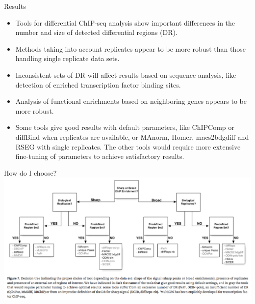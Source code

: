 \documentclass{beamer}
\begin{document}
\begin{frame}{Results}
\begin{itemize}
\item Tools for differential ChIP-seq analysis show important differences in the number and size of detected differential regions (DR).
\item Methods taking into account replicates appear to be more robust than those handling single replicate data sets.
\item Inconsistent sets of DR will affect results based on sequence analysis, like detection of enriched transcription factor binding sites.
\item Analysis of functional enrichments based on neighboring genes appears to be more robust.
\item Some tools give good results with default parameters, like ChIPComp or diffBind when replicates are available, or MAnorm, Homer, macs2bdgdiff and RSEG with single replicates. The other tools would require more extensive fine-tuning of parameters to achieve satisfactory results.
\end{itemize}
\end{frame}

\begin{frame}{How do I choose?}
\includegraphics[width=\linewidth]{diffdt.png}
\end{frame}
\end{document}
